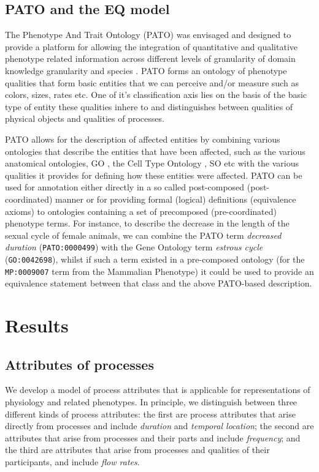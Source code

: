\documentclass{bioinfo}
\renewcommand{\cite}{\citep}
\begin{document}
\subsection{PATO and the EQ model}
The Phenotype And Trait Ontology (PATO) was envisaged and designed to
provide a platform for allowing the integration of quantitative and
qualitative phenotype related information across different levels of
granularity of domain knowledge granularity and species
\cite{Gkoutos2005}.  PATO forms an ontology of phenotype qualities
that form basic entities that we can perceive and/or measure such as
colors, sizes, rates etc. One of it's classification axis lies on the
basis of the basic type of entity these qualities inhere to and
distinguishes between qualities of physical objects and qualities of
processes.

PATO allows for the description of affected entities by combining
various ontologies that describe the entities that have been affected,
such as the various anatomical ontologies, GO \cite {Ashburner2000b},
the Cell Type Ontology \cite {Bard2005a}, SO \cite {Eilbeck2005} etc
with the various qualities it provides for defining how these entities
were affected.  PATO can be used for annotation either directly in a
so called post-composed (post-coordinated) manner or for providing
formal (logical) definitions (equivalence axioms) to ontologies
containing a set of precomposed (pre-coordinated) phenotype terms. For
instance, to describe the decrease in the length of the sexual cycle
of female animals, we can combine the PATO term \textit{decreased
  duration} ({\tt PATO:0000499}) with the Gene Ontology term
\textit{estrous cycle} ({\tt GO:0042698}), whilst if such a term
existed in a pre-composed ontology (for the {\tt MP:0009007} term from
the Mammalian Phenotype) it could be used to provide an equivalence
statement between that class and the above PATO-based description.

\section{Results}
\subsection{Attributes of processes}
We develop a model of process attributes that is applicable for
representations of physiology and related phenotypes. In principle, we
distinguish between three different kinds of process attributes:
the first are process attributes that arise directly from processes
and include {\em duration} and {\em temporal location}; the second are
attributes that arise from processes and their parts and include {\em
  frequency}; and the third are attributes that arise from processes
and qualities of their participants, and include {\em flow rates}.
\end{document}

